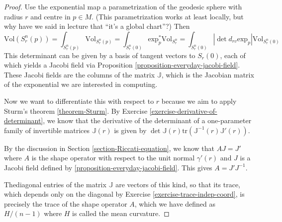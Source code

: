 \documentclass{book}
\begin{document}
\begin{proof}
Use the exponential map a parametrization of
the geodesic sphere with radius
$r$ and centre in $p\in M$. (This
parametrization works at least locally, but
why
have we said in lecture that ``it's a global
chart''?) Then
$$
\text{Vol}(S^n_r(p))=\int_{S^n_r(p)}
\text{Vol}_{S^n_r(p)}=
\int_{S^n_r(0)}\text{exp}_p^*\text{Vol}
_{S^n_r}=
\int_{S^n_r(0)}|\det d_{rv}
\text{exp}_p|\text{Vol}_{S^n_r(0)}
$$
This determinant can be given by a basis of
tangent vectors to $S_r(0)$, each of
which yields a Jacobi field via Proposition
\ref{proposition-everyday-jacobi-field}.
These Jacobi fields are the columns
of the matrix $\mathbb{J}$, which is the
Jacobian matrix of the exponential we
are interested in computing.

Now we want to differentiate this with
respect to $r$ because we aim to apply
Sturm's theorem \ref{theorem-Sturm}. By
Exercise
\ref{exercise-derivative-of-determinant}, we
know that the derivative of the
determinant of a one-parameter family of
invertible matrices $\mathbb{J}(r)$ is
given by $\det
\mathbb{J}(r)\text{tr}(\mathbb{J}^{-1}(r)
\mathbb{J}'(r))$.

By the discussion in Section
\ref{section-Riccati-equation}, we know that
$AJ=J'$ where $A$ is the shape operator with
respect to the unit normal
$\gamma'(r)$ and $J$ is a Jacobi field
defined by
\ref{proposition-everyday-jacobi-field}.
This gives $A=J'J^{-1}$.

Thediagonal entries of the matrix
$\mathbb{J}$ are vectors of this kind, so
that
 its trace, which depends only on the
 diagonal by Exercise
\ref{exercise-trace-indep-coord}, is
precisely the trace of
the shape operator $A$, which we have defined
as $H/(n-1)$ where
$H$ is called the mean curvature.


\end{proof}
\end{document}
